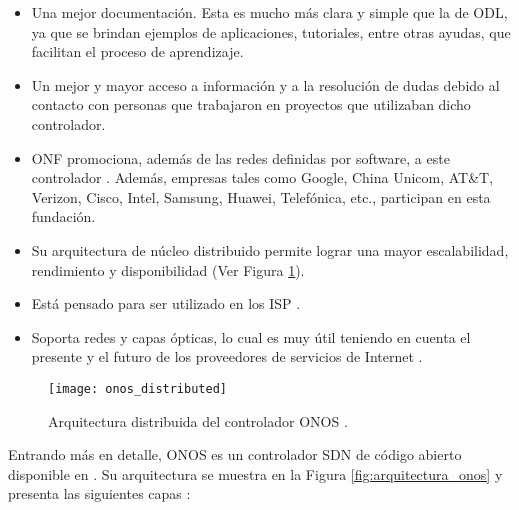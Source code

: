 \begin{itemize}
\item {Una mejor documentación. Esta es mucho más clara y simple que la de ODL,
    ya que se brindan ejemplos de aplicaciones, tutoriales, entre otras ayudas,
    que facilitan el proceso de aprendizaje. }
\item {Un mejor y mayor acceso a información y a la resolución de dudas debido al
    contacto con personas que trabajaron en proyectos que utilizaban dicho
    controlador. }
\item {ONF promociona, además de las redes definidas por software, a este controlador \parencite{wp_onos}. Además, 
    empresas tales como Google, China Unicom, AT\&T, Verizon, Cisco, Intel,
    Samsung, Huawei, Telefónica, etc., participan en esta fundación.}
\item {Su arquitectura de núcleo distribuido permite lograr una mayor
    escalabilidad, rendimiento y disponibilidad \parencite{tech_onos} (Ver
    Figura \ref{fig:distributed_core_onos}). }
\item {Está pensado para ser utilizado en los ISP \parencite{wp_onos}.}
\item {Soporta redes y capas ópticas, lo cual es muy útil teniendo en cuenta el
    presente y el futuro de los proveedores de servicios de Internet
    \parencite{wp_onos}. }
\end {itemize}

\begin{figure}[h]
	\centering 
	\texttt{[image: onos\_distributed]}
	\caption[Arquitectura distribuida del controlador ONOS]{Arquitectura distribuida del controlador ONOS \parencite{onos_arch}.}
	\label{fig:distributed_core_onos}
\end{figure}

Entrando más en detalle, ONOS es un controlador SDN de código abierto disponible
en \parencite{git_onos}. Su arquitectura se muestra en la
Figura \ref{fig:arquitectura_onos} y presenta las siguientes capas
\parencite{onos_wiki}:

